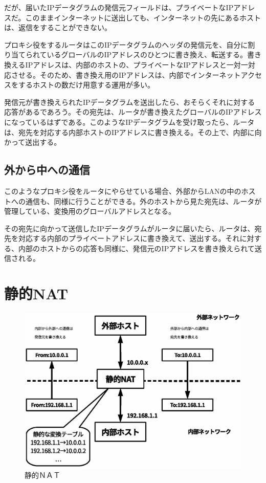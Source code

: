 だが、届いたIPデータグラムの発信元フィールドは、プライベートなIPアドレスだ。このままインターネットに送出しても、インターネットの先にあるホストは、返信をすることができない。

プロキシ役をするルータはこのIPデータグラムのヘッダの発信元を、自分に割り当てられているグローバルのIPアドレスのひとつに書き換え、転送する。書き換えるIPアドレスは、内部のホストの、プライベートなIPアドレスと一対一対応させる。そのため、書き換え用のIPアドレスは、内部でインターネットアクセスをするホストの数だけ用意する運用が多い。

発信元が書き換えられたIPデータグラムを送出したら、おそらくそれに対する応答があるであろう。その宛先は、ルータが書き換えたグローバルのIPアドレスになっているはずである。このようなIPデータグラムを受け取ったら、ルータは、宛先を対応する内部ホストのIPアドレスに書き換える。その上で、内部に向かって送出する。


\subsection{外から中への通信}
このようなプロキシ役をルータにやらせている場合、外部からLANの中のホストへの通信も、同様に行うことができる。外のホストから見た宛先は、ルータが管理している、変換用のグローバルアドレスとなる。

その宛先に向かって送信したIPデータグラムがルータに届いたら、ルータは、宛先を対応する内部のプライベートアドレスに書き換えて、送出する。それに対する、内部のホストからの応答も同様に、発信元のIPアドレスを書き換えられて送信される。

\section{静的NAT}

\begin{figure}[htbp]
	\includegraphics[width=12cm,clip]{draw/fig7.eps}
	\caption{静的ＮＡＴ}
	\label{fig:static-nat}
\end{figure}


